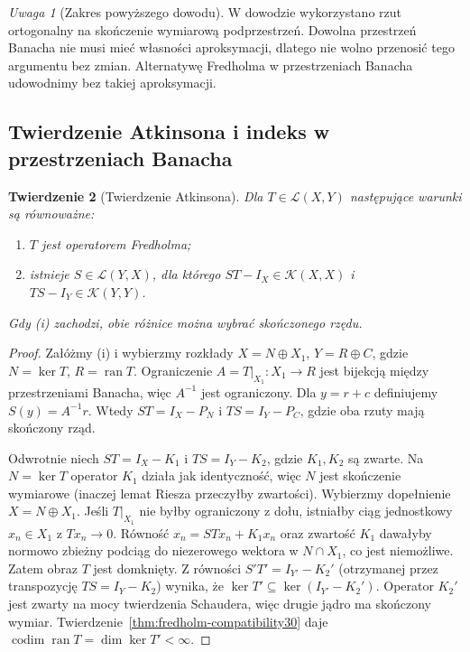 \documentclass[11pt,a4paper]{article}
\numberwithin{equation}{section}
\theoremstyle{plain}
\newtheorem{twierdzenie}{Twierdzenie}[section]
\theoremstyle{definition}
\theoremstyle{remark}
\newtheorem{uwaga}[twierdzenie]{Uwaga}
\begin{document}
\begin{uwaga}[Zakres powyższego dowodu]
\label{rem:fredholm-hilbert-scope30}
W dowodzie wykorzystano rzut ortogonalny na skończenie
wymiarową podprzestrzeń. Dowolna przestrzeń Banacha
nie musi mieć własności aproksymacji, dlatego nie wolno
przenosić tego argumentu bez zmian. Alternatywę Fredholma
w przestrzeniach Banacha udowodnimy bez takiej aproksymacji.
\end{uwaga}

\subsection{Twierdzenie Atkinsona i indeks w przestrzeniach Banacha}

\begin{twierdzenie}[Twierdzenie Atkinsona]
\label{thm:atkinson30}
Dla $T\in\mathcal L(X,Y)$ następujące warunki są równoważne:
\begin{enumerate}[label=\textup{(\roman*)}]
\item $T$ jest operatorem Fredholma;
\item istnieje $S\in\mathcal L(Y,X)$, dla którego
$ST-I_X\in\mathcal K(X,X)$ i $TS-I_Y\in\mathcal K(Y,Y)$.
\end{enumerate}
Gdy (i) zachodzi, obie różnice można wybrać skończonego rzędu.
\end{twierdzenie}
\begin{proof}
Załóżmy (i) i wybierzmy rozkłady $X=N\oplus X_1$,
$Y=R\oplus C$, gdzie $N=\ker T$, $R=\operatorname{ran}T$.
Ograniczenie $A=T|_{X_1}:X_1\to R$ jest bijekcją między
przestrzeniami Banacha, więc $A^{-1}$ jest ograniczony.
Dla $y=r+c$ definiujemy $S(y)=A^{-1}r$.
Wtedy $ST=I_X-P_N$ i $TS=I_Y-P_C$, gdzie oba rzuty
mają skończony rząd.

Odwrotnie niech $ST=I_X-K_1$ i $TS=I_Y-K_2$,
gdzie $K_1,K_2$ są zwarte. Na $N=\ker T$ operator
$K_1$ działa jak identyczność, więc $N$ jest skończenie
wymiarowe (inaczej lemat Riesza przeczyłby zwartości).
Wybierzmy dopełnienie $X=N\oplus X_1$.
Jeśli $T|_{X_1}$ nie byłby ograniczony z dołu, istniałby
ciąg jednostkowy $x_n\in X_1$ z $Tx_n\to0$.
Równość $x_n=STx_n+K_1x_n$ oraz zwartość $K_1$
dawałyby normowo zbieżny podciąg do niezerowego wektora
w $N\cap X_1$, co jest niemożliwe. Zatem obraz $T$
jest domknięty.
Z równości $S'T'=I_{Y'}-K_2'$ (otrzymanej przez
transpozycję $TS=I_Y-K_2$) wynika, że
$\ker T'\subseteq\ker(I_{Y'}-K_2')$.
Operator $K_2'$ jest zwarty na mocy twierdzenia Schaudera,
więc drugie jądro ma skończony wymiar.
Twierdzenie~\ref{thm:fredholm-compatibility30} daje
$\operatorname{codim}\operatorname{ran}T=\dim\ker T'<\infty$.
\end{proof}
\end{document}
